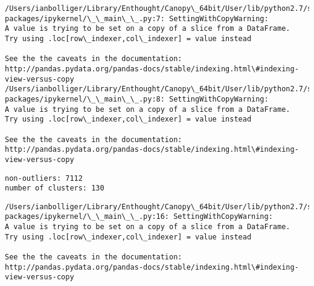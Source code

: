 \documentclass{article}
\begin{document}
    \begin{Verbatim}[commandchars=\\\{\}]
/Users/ianbolliger/Library/Enthought/Canopy\_64bit/User/lib/python2.7/site-packages/ipykernel/\_\_main\_\_.py:7: SettingWithCopyWarning: 
A value is trying to be set on a copy of a slice from a DataFrame.
Try using .loc[row\_indexer,col\_indexer] = value instead

See the the caveats in the documentation: http://pandas.pydata.org/pandas-docs/stable/indexing.html\#indexing-view-versus-copy
/Users/ianbolliger/Library/Enthought/Canopy\_64bit/User/lib/python2.7/site-packages/ipykernel/\_\_main\_\_.py:8: SettingWithCopyWarning: 
A value is trying to be set on a copy of a slice from a DataFrame.
Try using .loc[row\_indexer,col\_indexer] = value instead

See the the caveats in the documentation: http://pandas.pydata.org/pandas-docs/stable/indexing.html\#indexing-view-versus-copy
    \end{Verbatim}

    \begin{Verbatim}[commandchars=\\\{\}]
non-outliers: 7112
number of clusters: 130
    \end{Verbatim}

    \begin{Verbatim}[commandchars=\\\{\}]
/Users/ianbolliger/Library/Enthought/Canopy\_64bit/User/lib/python2.7/site-packages/ipykernel/\_\_main\_\_.py:16: SettingWithCopyWarning: 
A value is trying to be set on a copy of a slice from a DataFrame.
Try using .loc[row\_indexer,col\_indexer] = value instead

See the the caveats in the documentation: http://pandas.pydata.org/pandas-docs/stable/indexing.html\#indexing-view-versus-copy
    \end{Verbatim}
\end{document}
